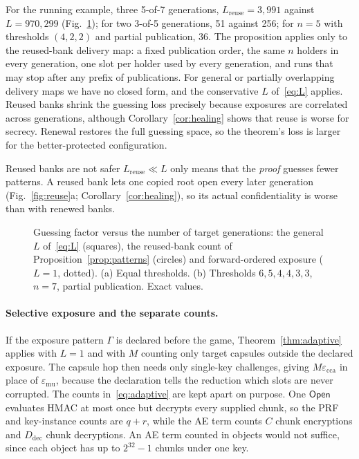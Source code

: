 \documentclass[pdflatex,sn-mathphys-num]{sn-jnl}%
\theoremstyle{plain}
\theoremstyle{definition}
\begin{document}
For the running example, three 5-of-7 generations, $L_{\mathrm{reuse}}=3{,}991$ against $L=970{,}299$ (Fig.~\ref{fig:guess}); for two 3-of-5 generations, 51 against 256; for $n=5$ with thresholds $(4,2,2)$ and partial publication, 36. The proposition applies only to the reused-bank delivery map: a fixed publication order, the same $n$ holders in every generation, one slot per holder used by every generation, and runs that may stop after any prefix of publications. For general or partially overlapping delivery maps we have no closed form, and the conservative $L$ of~\eqref{eq:L} applies. Reused banks shrink the guessing loss precisely because exposures are correlated across generations, although Corollary~\ref{cor:healing} shows that reuse is worse for secrecy. Renewal restores the full guessing space, so the theorem's loss is larger for the better-protected configuration.

\begin{warnbox}{Reused banks are not safer}
$L_{\mathrm{reuse}}\ll L$ only means that the \emph{proof} guesses fewer patterns. A reused bank lets one copied root open every later generation (Fig.~\ref{fig:reuse}a; Corollary~\ref{cor:healing}), so its actual confidentiality is worse than with renewed banks.
\end{warnbox}

\begin{figure}[t]
\centering
\figbox{}
\caption{Guessing factor versus the number of target generations: the general $L$ of~\eqref{eq:L} (squares), the reused-bank count of Proposition~\ref{prop:patterns} (circles) and forward-ordered exposure ($L=1$, dotted). (a) Equal thresholds. (b) Thresholds $6,5,4,4,3,3$, $n=7$, partial publication. Exact values.}\label{fig:guess}
\end{figure}

\paragraph{Selective exposure and the separate counts.}
If the exposure pattern $\Gamma$ is declared before the game, Theorem~\ref{thm:adaptive} applies with $L=1$ and with $M$ counting only target capsules outside the declared exposure. The capsule hop then needs only single-key challenges, giving $M\varepsilon_{\mathrm{cca}}$ in place of $\varepsilon_{\mathrm{mu}}$, because the declaration tells the reduction which slots are never corrupted. The counts in~\eqref{eq:adaptive} are kept apart on purpose. One $\mathsf{Open}$ evaluates HMAC at most once but decrypts every supplied chunk, so the PRF and key-instance counts are $q+r$, while the AE term counts $C$ chunk encryptions and $D_{\mathrm{dec}}$ chunk decryptions. An AE term counted in objects would not suffice, since each object has up to $2^{32}-1$ chunks under one key.
\end{document}
